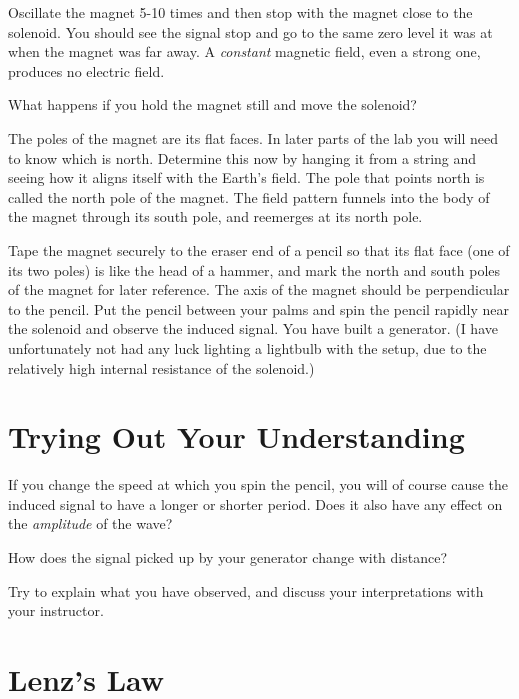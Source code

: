
Oscillate the magnet 5-10 times and then stop with the magnet close to the solenoid.
You should see the signal stop and go to the same zero level it was at when the
magnet was far away. A \emph{constant} magnetic field, even a strong one, produces no
electric field.


What happens if you hold the magnet still and move the solenoid? 

The poles of the magnet are its flat faces. In later parts
of the lab you will need to know which is north. Determine
this now by hanging it from a string and seeing how it aligns itself with the Earth's field.
The pole that points north is called the north pole of the
magnet. The field pattern funnels into the body of the magnet
through its south pole, and reemerges at its north pole.


Tape the magnet securely to the eraser end of a pencil so
that its flat face (one of its two poles) is like the head
of a hammer, and mark the north and south poles of the
magnet for later reference. The axis of the magnet should be
perpendicular to the pencil. Put the pencil between your palms and spin the pencil rapidly near the
solenoid and observe the induced signal. You have built a
generator. (I have unfortunately not had any luck lighting a
lightbulb with the setup, due to the relatively high
internal resistance of the solenoid.)

\section*{Trying Out Your Understanding}


If you change the speed at which you spin the pencil, you
will of course cause the induced signal to have a longer or
shorter period. Does it also have any effect on the
\emph{amplitude} of the wave?


How does the signal picked up by your generator change with distance?

Try to explain what you have observed, and discuss your
interpretations with your instructor.

\section*{Lenz's Law}


